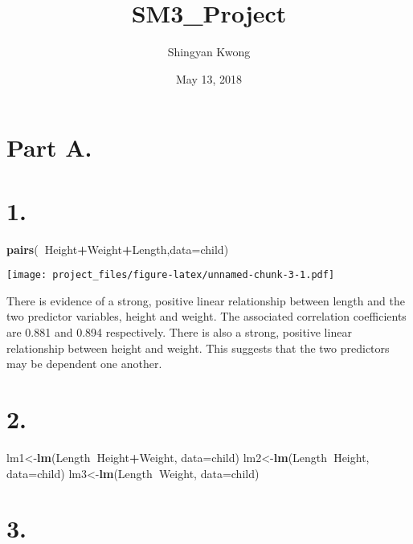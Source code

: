 \documentclass[]{article}
\title{SM3\_Project}
\author{Shingyan Kwong}
\date{May 13, 2018}
\newenvironment{Shaded}{\begin{snugshade}}{\end{snugshade}}
\newcommand{\KeywordTok}[1]{\textcolor[rgb]{0.13,0.29,0.53}{\textbf{#1}}}
\newcommand{\DataTypeTok}[1]{\textcolor[rgb]{0.13,0.29,0.53}{#1}}
\newcommand{\OperatorTok}[1]{\textcolor[rgb]{0.81,0.36,0.00}{\textbf{#1}}}
\newcommand{\NormalTok}[1]{#1}
\begin{document}
\maketitle

\section{Part A.}\label{part-a.}

\section{1.}\label{section}

\begin{Shaded}
\begin{Highlighting}[]
\KeywordTok{pairs}\NormalTok{(}\OperatorTok{~}\NormalTok{Height}\OperatorTok{+}\NormalTok{Weight}\OperatorTok{+}\NormalTok{Length,}\DataTypeTok{data=}\NormalTok{child)}
\end{Highlighting}
\end{Shaded}

\texttt{[image: project\_files/figure-latex/unnamed-chunk-3-1.pdf]}

There is evidence of a strong, positive linear relationship between
length and the two predictor variables, height and weight. The
associated correlation coefficients are 0.881 and 0.894 respectively.
There is also a strong, positive linear relationship between height and
weight. This suggests that the two predictors may be dependent one
another.

\section{2.}\label{section-1}

\begin{Shaded}
\begin{Highlighting}[]
\NormalTok{lm1<-}\KeywordTok{lm}\NormalTok{(Length}\OperatorTok{~}\NormalTok{Height}\OperatorTok{+}\NormalTok{Weight, }\DataTypeTok{data=}\NormalTok{child)}
\NormalTok{lm2<-}\KeywordTok{lm}\NormalTok{(Length}\OperatorTok{~}\NormalTok{Height, }\DataTypeTok{data=}\NormalTok{child)}
\NormalTok{lm3<-}\KeywordTok{lm}\NormalTok{(Length}\OperatorTok{~}\NormalTok{Weight, }\DataTypeTok{data=}\NormalTok{child)}
\end{Highlighting}
\end{Shaded}

\section{3.}\label{section-2}
\end{document}
